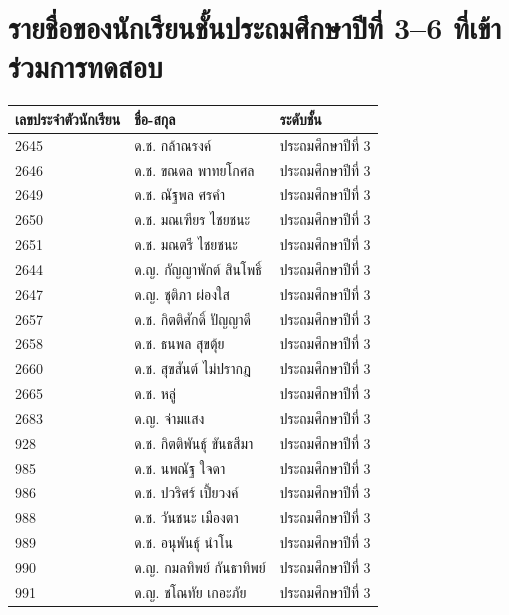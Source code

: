 \section{รายชื่อของนักเรียนชั้นประถมศึกษาปีที่ 3--6 ที่เข้าร่วมการทดสอบ}
\begin{center}
    \begin{tabular}{ |p{3cm}|p{4cm}|p{3cm}| }
        \hline
        เลขประจำตัวนักเรียน & ชื่อ-สกุล & ระดับชั้น\\
        \hline
        2645 & ด.ช. กล้าณรงค์ & ประถมศึกษาปีที่ 3\\
        \hline
        2646 & ด.ช. ขณดล พาทยโกศล & ประถมศึกษาปีที่ 3\\
        \hline
        2649 & ด.ช. ณัฐพล ศรคำ & ประถมศึกษาปีที่ 3\\
        \hline
        2650 & ด.ช. มณเฑียร ไชยชนะ & ประถมศึกษาปีที่ 3\\
        \hline
        2651 & ด.ช. มณตรี ไชยชนะ & ประถมศึกษาปีที่ 3\\
        \hline
        2644 & ด.ญ. กัญญาพักต์ สินโพธิ์ & ประถมศึกษาปีที่ 3\\
        \hline
        2647 & ด.ญ. ชุติภา ผ่องใส & ประถมศึกษาปีที่ 3\\
        \hline
        2657 & ด.ช. กิตติศักดิ์ ปัญญาดี & ประถมศึกษาปีที่ 3\\
        \hline
        2658 & ด.ช. ธนพล สุขตุ้ย & ประถมศึกษาปีที่ 3\\
        \hline
        2660 & ด.ช. สุขสันต์ ไม่ปรากฎ & ประถมศึกษาปีที่ 3\\
        \hline
        2665 & ด.ช. หลู่ & ประถมศึกษาปีที่ 3\\
        \hline
        2683 & ด.ญ. จ่ามแสง & ประถมศึกษาปีที่ 3\\
        \hline
        928 & ด.ช. กิตติพันธุ์ ขันธสีมา & ประถมศึกษาปีที่ 3\\
        \hline
        985 & ด.ช. นพณัฐ ใจดา & ประถมศึกษาปีที่ 3\\
        \hline
        986 & ด.ช. ปวริศร์ เปี้ยวงค์ & ประถมศึกษาปีที่ 3\\
        \hline
        988 & ด.ช. วันชนะ เมืองตา & ประถมศึกษาปีที่ 3\\
        \hline
        989 & ด.ช. อนุพันธุ์ นำโน & ประถมศึกษาปีที่ 3\\
        \hline
        990 & ด.ญ. กมลทิพย์ กันธาทิพย์ & ประถมศึกษาปีที่ 3\\
        \hline
        991 & ด.ญ. ชโณทัย เกอะภัย & ประถมศึกษาปีที่ 3\\
        \hline

\end{tabular}
\end{center}
